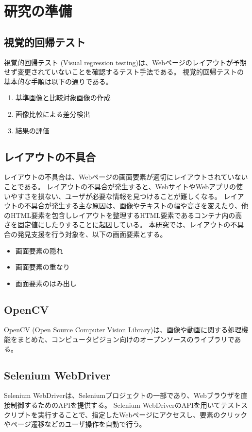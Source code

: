 \chapter{研究の準備}\label{cha:Preparation}

\section{視覚的回帰テスト}\label{sec:vrt}
視覚的回帰テスト (Visual regression testing)\cite{Visual regression testing}は、Webページのレイアウトが予期せず変更されていないことを確認するテスト手法である。
視覚的回帰テストの基本的な手順は以下の通りである。
\begin{enumerate}
    \setlength{\itemsep}{0pt}
          \setlength{\parsep}{0pt}
    \item 基準画像と比較対象画像の作成
    \item 画像比較による差分検出
    \item 結果の評価
\end{enumerate}

\section{レイアウトの不具合}\label{sec:layout effect}
レイアウトの不具合は、Webページの画面要素が適切にレイアウトされていないことである。
レイアウトの不具合が発生すると、WebサイトやWebアプリの使いやすさを損ない、ユーザが必要な情報を見つけることが難しくなる。
レイアウトの不具合が発生する主な原因は、画像やテキストの幅や高さを変えたり、他のHTML要素を包含しレイアウトを整理するHTML要素であるコンテナ内の高さを固定値にしたりすることに起因している。
本研究では、レイアウトの不具合の発見支援を行う対象を、以下の画面要素とする。
\begin{itemize}
    \setlength{\itemsep}{0pt}
          \setlength{\parsep}{0pt}
    \item 画面要素の隠れ
    \item 画面要素の重なり
    \item 画面要素のはみ出し
\end{itemize}

\section{OpenCV}\label{sec:OpenCV}
OpenCV (Open Source Computer Vision Library)は、画像や動画に関する処理機能をまとめた、コンピュータビジョン向けのオープンソースのライブラリである\cite{OpenCV}。

\section{Selenium WebDriver}\label{sec:Selenium_WebDriver}
Selenium WebDriver\cite{Selenium WebDriver}は、Seleniumプロジェクト\cite{Selenium}の一部であり、Webブラウザを直接制御するためのAPIを提供する。
Selenium WebDriverのAPIを用いてテストスクリプトを実行することで、指定したWebページにアクセスし、要素のクリックやページ遷移などのユーザ操作を自動で行う。
